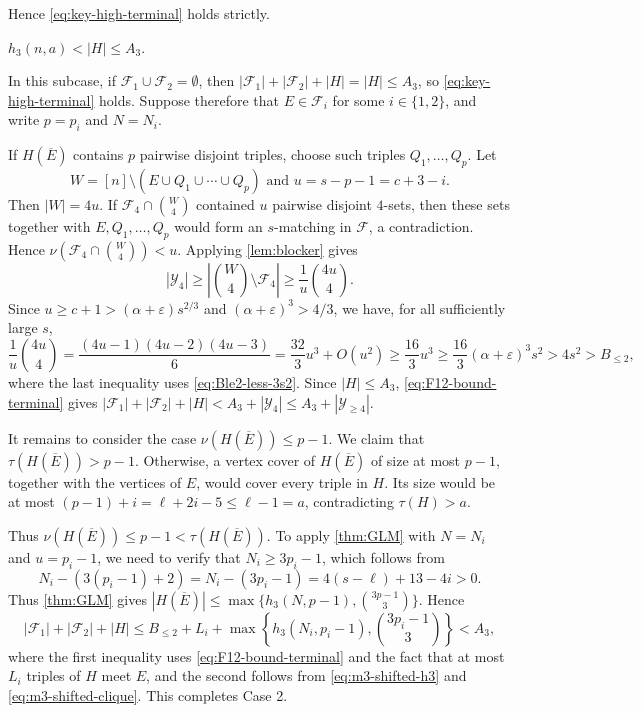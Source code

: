 \documentclass[10pt,a4paper]{article}
\numberwithin{equation}{section}
\theoremstyle{definition}
\newcommand{\F}{\mathcal F}
\newcommand{\Y}{\mathcal Y}
\begin{document}
Hence \eqref{eq:key-high-terminal} holds strictly.

\medskip
{} $h_3(n,a)<|H|\le A_3$.
\medskip

In this subcase, if $\F_1\cup\F_2=\emptyset$, then $|\F_1|+|\F_2|+|H|=|H|\le A_3$, so \eqref{eq:key-high-terminal} holds.
Suppose therefore that $E\in\F_i$ for some $i\in\{1,2\}$, and write $p=p_i$ and $N=N_i$.

If $H(\overline E)$ contains $p$ pairwise disjoint triples, choose such triples $Q_1,\ldots,Q_p$.
Let
\[
        W=[n]\setminus\left(E\cup Q_1\cup\cdots\cup Q_p\right)
        \text{ and }
        u=s-p-1=c+3-i.
\]
Then $|W|=4u$.
If $\F_4\cap\binom W4$ contained $u$ pairwise disjoint $4$-sets, then these sets together with $E,Q_1,\ldots,Q_p$ would form an $s$-matching in $\F$, a contradiction.
Hence $\nu(\F_4\cap\binom W4)<u$.
Applying \cref{lem:blocker} gives
\[
        |\Y_4|\ge\left|\binom W4\setminus\F_4\right|
        \ge \frac1u\binom{4u}{4}.
\]
Since $u\ge c+1>(\alpha+\varepsilon)s^{2/3}$ and $(\alpha+\varepsilon)^3>4/3$, we have, for all sufficiently large $s$,
\[
        \frac1u\binom{4u}{4}
        =\frac{(4u-1)(4u-2)(4u-3)}6
        =\frac{32}{3}u^3+O(u^2)
        \ge \frac{16}{3}u^3
        \ge \frac{16}{3}(\alpha+\varepsilon)^3s^2
        >4s^2>B_{\le2},
\]
where the last inequality uses \eqref{eq:Ble2-less-3s2}.
Since $|H|\le A_3$, \eqref{eq:F12-bound-terminal} gives $|\F_1|+|\F_2|+|H|<A_3+|\Y_4|\le A_3+|\Y_{\ge4}|$.

It remains to consider the case $\nu(H(\overline E))\le p-1$.
We claim that $\tau(H(\overline E))>p-1$.
Otherwise, a vertex cover of $H(\overline E)$ of size at most $p-1$, together with the vertices of $E$, would cover every triple in $H$.
Its size would be at most $(p-1)+i=\ell+2i-5\le\ell-1=a$, contradicting $\tau(H)>a$.

Thus $\nu(H(\overline E))\le p-1<\tau(H(\overline E))$.
To apply \cref{thm:GLM} with $N=N_i$ and $u=p_i-1$, we need to verify that $N_i\ge 3p_i-1$, which follows from
\[
        N_i-(3(p_i-1)+2)=N_i-(3p_i-1)=4(s-\ell)+13-4i>0.
\]
Thus \cref{thm:GLM} gives $|H(\overline E)|\le\max\{h_3(N,p-1),\binom{3p-1}{3}\}$.
Hence
\[
        |\F_1|+|\F_2|+|H|
        \le
        B_{\le2}+L_i+\max\left\{h_3(N_i,p_i-1),\binom{3p_i-1}{3}\right\}
        <A_3,
\]
where the first inequality uses \eqref{eq:F12-bound-terminal} and the fact that at most $L_i$ triples of $H$ meet $E$, and the second follows from \eqref{eq:m3-shifted-h3} and \eqref{eq:m3-shifted-clique}.
This completes Case 2.
\end{document}
